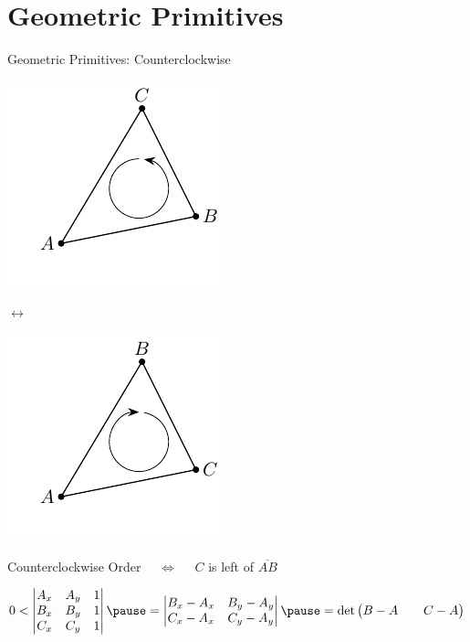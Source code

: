 \documentclass[aspectratio=169]{beamer}
\begin{document}
\section{Geometric Primitives}
\begin{frame}{Geometric Primitives: Counterclockwise}
  \begin{minipage}[c]{0.4\textwidth}
      \centering
      \includegraphics{figures/triangle-counterclockwise.pdf}
  \end{minipage}
  \hfill
  $\longleftrightarrow$
  \hfill
  \begin{minipage}[c]{0.4\textwidth}
      \centering
      \includegraphics{figures/triangle-clockwise.pdf}
  \end{minipage}

  Counterclockwise Order
  \pause
  $\quad\iff\quad$ $C$ is left of $\overline{AB}$

  \bigskip

  \pause
  \begin{mybox}
  \[
    0 <
    \begin{vmatrix}
      A_x & A_y & 1 \\
      B_x & B_y & 1 \\
      C_x & C_y & 1 \\
    \end{vmatrix}
    \pause
    =
    \begin{vmatrix}
      B_x - A_x & B_y - A_y \\
      C_x - A_x & C_y - A_y \\
    \end{vmatrix}
    \pause
    =
    \det
    \begin{pmatrix}
      B-A && C-A
    \end{pmatrix}
  \]
  \end{mybox}
\end{frame}
\end{document}
